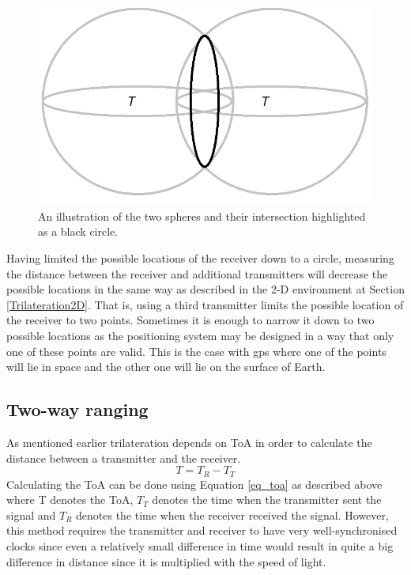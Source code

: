 			\begin{figure}[H] 
			  \centering
			      \includegraphics[height=0.25\textwidth]{img/2Spheres}
			  \caption{An illustration of the two spheres and their intersection highlighted as a black circle.}
			  \label{fig_2spheres}
			\end{figure}

			Having limited the possible locations of the receiver down to a circle, measuring the distance between the receiver and additional transmitters will decrease the possible locations in the same way as described in the 2-D environment at Section \ref{Trilateration2D}. That is, using a third transmitter limits the possible location of the receiver to two points. Sometimes it is enough to narrow it down to two possible locations as the positioning system may be designed in a way that only one of these points are valid. This is the case with \gls{gps} where one of the points will lie in space and the other one will lie on the surface of Earth.


	\subsection{Two-way ranging} %
		As mentioned earlier trilateration depends on ToA in order to calculate the distance between a transmitter and the receiver. 
		\begin{equation} \label{eq_toa}
		T = T_R - T_T
		\end{equation}
		Calculating the ToA can be done using 
		Equation \ref{eq_toa} as described above where T denotes the ToA, $T_T$ denotes the time when the transmitter sent the signal and $T_R$ denotes the time when the receiver received the signal. However, this method requires the transmitter and receiver to have very well-synchronised clocks since even a relatively small difference in time would result in quite a big difference in distance since it is multiplied with the speed of light.

